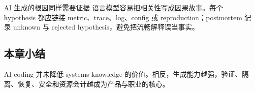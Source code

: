 \begin{warningbox}{AI 生成的根因同样需要证据}
语言模型容易把相关性写成因果故事。每个 hypothesis 都应链接 metric、trace、log、config 或 reproduction；postmortem 记录 unknown 与 rejected hypothesis，避免把流畅解释误当事实。
\end{warningbox}


\subsection{本章小结}

AI coding 并未降低 systems knowledge 的价值。相反，生成能力越强，验证、隔离、恢复、安全和资源会计越成为产品与职业的核心。

